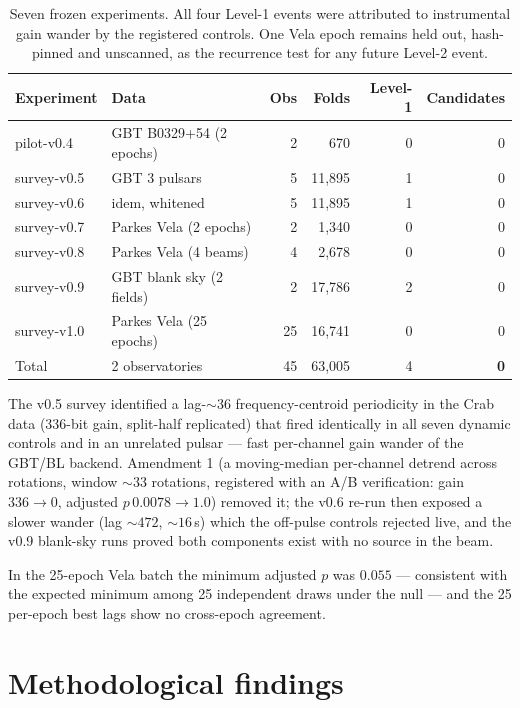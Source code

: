 \documentclass[11pt]{article}
\begin{document}
\begin{table}[h]
\centering\small
\begin{tabular}{llrrrr}
\toprule
Experiment & Data & Obs & Folds & Level-1 & Candidates\\
\midrule
pilot-v0.4 & GBT B0329+54 (2 epochs) & 2 & 670 & 0 & 0\\
survey-v0.5 & GBT 3 pulsars & 5 & 11{,}895 & 1 & 0\\
survey-v0.6 & idem, whitened & 5 & 11{,}895 & 1 & 0\\
survey-v0.7 & Parkes Vela (2 epochs) & 2 & 1{,}340 & 0 & 0\\
survey-v0.8 & Parkes Vela (4 beams) & 4 & 2{,}678 & 0 & 0\\
survey-v0.9 & GBT blank sky (2 fields) & 2 & 17{,}786 & 2 & 0\\
survey-v1.0 & Parkes Vela (25 epochs) & 25 & 16{,}741 & 0 & 0\\
\midrule
Total & 2 observatories & 45 & 63{,}005 & 4 & \textbf{0}\\
\bottomrule
\end{tabular}
\caption{Seven frozen experiments. All four Level-1 events were attributed to
instrumental gain wander by the registered controls. One Vela epoch remains
held out, hash-pinned and unscanned, as the recurrence test for any future
Level-2 event.}
\end{table}

The v0.5 survey identified a lag-${\sim}36$ frequency-centroid periodicity in
the Crab data (336-bit gain, split-half replicated) that fired identically in
all seven dynamic controls and in an unrelated pulsar --- fast per-channel
gain wander of the GBT/BL backend. Amendment 1 (a moving-median per-channel
detrend across rotations, window ${\sim}33$ rotations, registered with an A/B
verification: gain $336 \to 0$, adjusted $p\,0.0078 \to 1.0$) removed it; the
v0.6 re-run then exposed a slower wander (lag ${\sim}472$, ${\sim}16$\,s)
which the off-pulse controls rejected live, and the v0.9 blank-sky runs proved
both components exist with no source in the beam.

In the 25-epoch Vela batch the minimum adjusted $p$ was $0.055$ ---
consistent with the expected minimum among 25 independent draws under the
null --- and the 25 per-epoch best lags show no cross-epoch agreement.

\section{Methodological findings}
\end{document}
